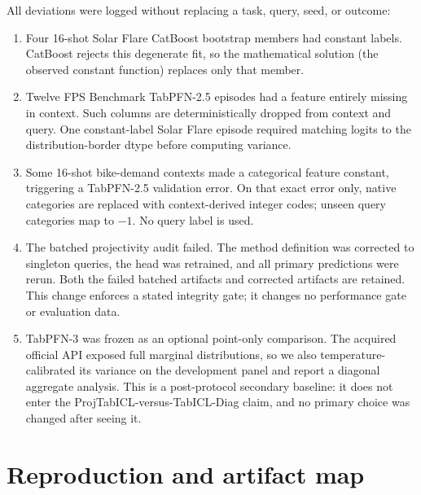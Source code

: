 All deviations were logged without replacing a task, query, seed, or outcome:
\begin{enumerate}
  \item Four 16-shot Solar Flare CatBoost bootstrap members had constant
  labels.  CatBoost rejects this degenerate fit, so the mathematical solution
  (the observed constant function) replaces only that member.
  \item Twelve FPS Benchmark TabPFN-2.5 episodes had a feature entirely
  missing in context.  Such columns are deterministically dropped from context
  and query.  One constant-label Solar Flare episode required matching logits
  to the distribution-border dtype before computing variance.
  \item Some 16-shot bike-demand contexts made a categorical feature constant,
  triggering a TabPFN-2.5 validation error.  On that exact error only, native
  categories are replaced with context-derived integer codes; unseen query
  categories map to $-1$.  No query label is used.
  \item The batched projectivity audit failed.  The method definition was
  corrected to singleton queries, the head was retrained, and all primary
  predictions were rerun.  Both the failed batched artifacts and corrected
  artifacts are retained.  This change enforces a stated integrity gate; it
  changes no performance gate or evaluation data.
  \item TabPFN-3 was frozen as an optional point-only comparison.  The acquired
  official API exposed full marginal distributions, so we also temperature-
  calibrated its variance on the development panel and report a diagonal
  aggregate analysis.  This is a post-protocol secondary baseline: it does not
  enter the ProjTabICL-versus-TabICL-Diag claim, and no primary choice was
  changed after seeing it.
\end{enumerate}

\section{Reproduction and artifact map}\label{app:repro}

